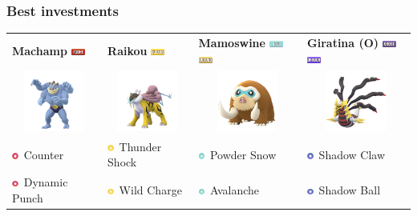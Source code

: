 \documentclass[12pt]{beamer}
\newcommand{\fightingfull}{\includegraphics[height=0.2cm]{../../images/type/full/Fighting.png}}
\newcommand{\electricfull}{\includegraphics[height=0.2cm]{../../images/type/full/Electric.png}}
\newcommand{\ghostfull}{\includegraphics[height=0.2cm]{../../images/type/full/Ghost.png}}
\newcommand{\dragonfull}{\includegraphics[height=0.2cm]{../../images/type/full/Dragon.png}}
\newcommand{\groundfull}{\includegraphics[height=0.2cm]{../../images/type/full/Ground.png}}
\newcommand{\icefull}{\includegraphics[height=0.2cm]{../../images/type/full/Ice.png}}
\newcommand{\fightingsimp}{\includegraphics[height=0.2cm]{../../images/type/simplified/fighting.png}}
\newcommand{\ghostsimp}{\includegraphics[height=0.2cm]{../../images/type/simplified/ghost.png}}
\newcommand{\icesimp}{\includegraphics[height=0.2cm]{../../images/type/simplified/ice.png}}
\newcommand{\electricsimp}{\includegraphics[height=0.2cm]{../../images/type/simplified/electric.png}}
\begin{document}
\begin{frame}
\begin{footnotesize}
\frametitle{Best investments}

\begin{block}{}
\begin{center}
\begin{tabular}{p{3cm}p{3cm}p{3cm}p{3cm}} 
     \textbf{Machamp} \hfill \fightingfull&  \textbf{Raikou} \hfill \electricfull&  \textbf{Mamoswine} \hfill  \icefull~\groundfull&  \textbf{Giratina (O)} \hfill \ghostfull~\dragonfull \\ 
      \multicolumn{1}{c}{\includegraphics[width=2cm]{../../images/pokemon/Machamp}} &   \multicolumn{1}{c}{\includegraphics[width=2cm]{../../images/pokemon/Raikou} }  &   \multicolumn{1}{c}{\includegraphics[width=2cm]{../../images/pokemon/Mamoswine} }   &   \multicolumn{1}{c}{\includegraphics[width=2cm]{../../images/pokemon/Giratina_o} }  \\ 
  \fightingsimp~Counter & \electricsimp~Thunder Shock  & \icesimp~Powder Snow &\ghostsimp~Shadow Claw  \\
   \fightingsimp~Dynamic Punch &\electricsimp~Wild Charge  & \icesimp~Avalanche &\ghostsimp~Shadow Ball \\  
\end{tabular}   

\bigskip
\bigskip
\bigskip


\end{center}
\end{block}
\end{footnotesize}
\end{frame}
\end{document}
